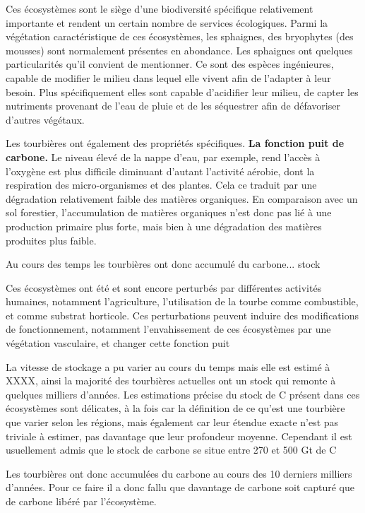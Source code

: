 Ces écosystèmes sont le siège d'une biodiversité spécifique relativement importante et rendent un certain nombre de services écologiques.
Parmi la végétation caractéristique de ces écosystèmes, les sphaignes, des bryophytes (des mousses) sont normalement présentes en abondance.
Les sphaignes ont quelques particularités qu'il convient de mentionner.
Ce sont des espèces ingénieures, capable de modifier le milieu dans lequel elle vivent afin de l'adapter à leur besoin.
Plus spécifiquement elles sont capable d'acidifier leur milieu, de capter les nutriments provenant de l'eau de pluie et de les séquestrer afin de défavoriser d'autres végétaux.

Les tourbières ont également des propriétés spécifiques.
\textbf{La fonction puit de carbone.}
Le niveau élevé de la nappe d'eau, par exemple, rend l'accès à l'oxygène est plus difficile diminuant d'autant l'activité aérobie, dont la respiration des micro-organismes et des plantes.
Cela ce traduit par une dégradation relativement faible des matières organiques.
En comparaison avec un sol forestier, l'accumulation de matières organiques n'est donc pas lié à une production primaire plus forte, mais bien à une dégradation des matières produites plus faible.

Au cours des temps les tourbières ont donc accumulé du carbone... stock

Ces écosystèmes ont été et sont encore perturbés par différentes activités humaines, notamment l'agriculture, l'utilisation de la tourbe comme combustible, et comme substrat horticole.
Ces perturbations peuvent induire des modifications de fonctionnement, notamment l'envahissement de ces écosystèmes par une végétation vasculaire, et changer cette fonction puit

La vitesse de stockage a pu varier au cours du temps mais elle est estimé à XXXX, ainsi la majorité des tourbières actuelles ont un stock qui remonte à quelques milliers d'années.
Les estimations précise du stock de C présent dans ces écosystèmes sont délicates, à la fois car la définition de ce qu'est une tourbière que varier selon les régions, mais également car leur étendue exacte n'est pas triviale à estimer, pas davantage que leur profondeur moyenne.
Cependant il est usuellement admis que le stock de carbone se situe entre 270 et 500 Gt de C

Les tourbières ont donc accumulées du carbone au cours des 10 derniers milliers d'années.
Pour ce faire il a donc fallu que davantage de carbone soit capturé que de carbone libéré par l'écosystème.

